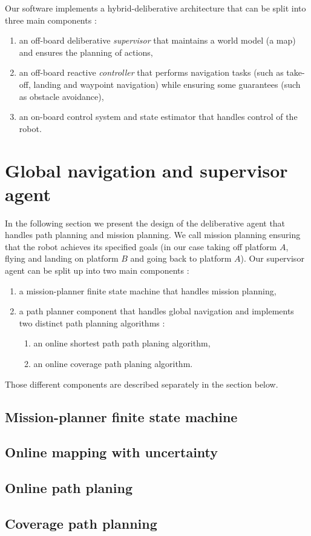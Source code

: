 \documentclass[11pt]{article}
\begin{document}
Our software implements a hybrid-deliberative architecture that can be split into three main components :
\begin{enumerate}
    \item an off-board deliberative \textit{supervisor} that maintains a world model (a map) and ensures the planning of actions,
    \item an off-board reactive \textit{controller} that performs navigation tasks (such as take-off, landing and waypoint navigation) while ensuring some guarantees (such as obstacle avoidance),
    \item an on-board control system and state estimator that handles control of the robot.
\end{enumerate}


\section{Global navigation and supervisor agent}

In the following section we present the design of the deliberative agent that handles path planning and mission planning. We call mission planning ensuring that the robot achieves its specified goals (in our case taking off platform $A$, flying and landing on platform $B$ and going back to platform $A$). Our supervisor agent can be split up into two main components : 
\begin{enumerate}
    \item a mission-planner finite state machine that handles mission planning,
    \item a path planner component that handles global navigation and implements two distinct path planning algorithms : 
    \begin{enumerate}
        \item an online shortest path path planing algorithm,
        \item an online coverage path planing algorithm.
    \end{enumerate}
\end{enumerate}

Those different components are described separately in the section below.


\subsection{Mission-planner finite state machine}

\subsection{Online mapping with uncertainty}

\subsection{Online path planing}

\subsection{Coverage path planning}

\cite{epsilon_star} \cite{Galceran13asurvey} \cite{recsplit}

\tableofcontents

\printbibliography %
\end{document}
